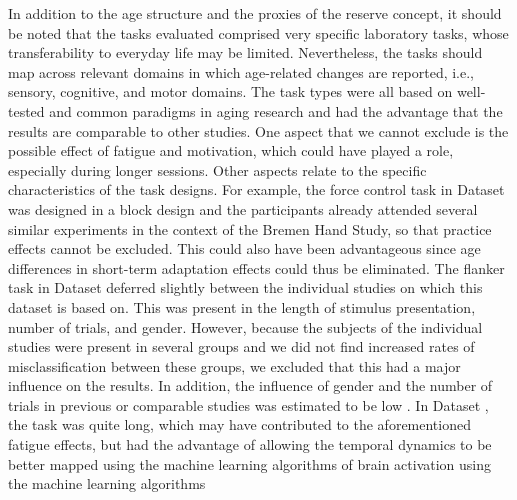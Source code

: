 In addition to the age structure and the proxies of the reserve concept, it should be noted that the tasks evaluated comprised very specific laboratory tasks, whose transferability to everyday life may be limited. Nevertheless, the tasks should map across relevant domains in which age-related changes are reported, i.e., sensory, cognitive, and motor domains. The task types were all based on well-tested and common paradigms in aging research and had the advantage that the results are comparable to other studies. One aspect that we cannot exclude is the possible effect of fatigue and motivation, which could have played a role, especially during longer sessions. Other aspects relate to the specific characteristics of the task designs. For example, the force control task in Dataset  was designed in a block design and the participants already attended several similar experiments in the context of the Bremen Hand Study, so that practice effects cannot be excluded. This could also have been advantageous since age differences in short-term adaptation effects could thus be eliminated. The flanker task in Dataset  deferred slightly between the individual studies on which this dataset is based on. This was present in the length of stimulus presentation, number of trials, and gender. However, because the subjects of the individual studies were present in several groups and we did not find increased rates of misclassification between these groups, we excluded that this had a major influence on the results. In addition, the influence of gender and the number of trials in previous or comparable studies was estimated to be low \cite{Reuter2019, Vahid2020}. In Dataset , the task was quite long, which may have contributed to the aforementioned fatigue effects, but had the advantage of allowing the temporal dynamics to be better mapped using the machine learning algorithms of brain activation using the machine learning algorithms 

